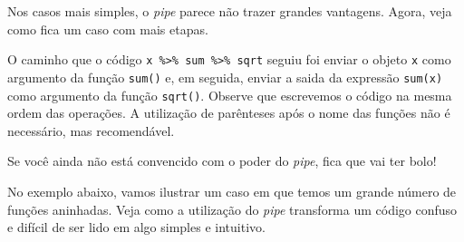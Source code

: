 \documentclass[]{book}
\newenvironment{Shaded}{\begin{snugshade}}{\end{snugshade}}
\newcommand{\CommentTok}[1]{\textcolor[rgb]{0.56,0.35,0.01}{\textit{#1}}}
\newcommand{\DecValTok}[1]{\textcolor[rgb]{0.00,0.00,0.81}{#1}}
\newcommand{\KeywordTok}[1]{\textcolor[rgb]{0.13,0.29,0.53}{\textbf{#1}}}
\newcommand{\NormalTok}[1]{#1}
\newcommand{\OperatorTok}[1]{\textcolor[rgb]{0.81,0.36,0.00}{\textbf{#1}}}
\newcommand{\StringTok}[1]{\textcolor[rgb]{0.31,0.60,0.02}{#1}}
\begin{document}
\begin{Shaded}
\end{Shaded}

Nos casos mais simples, o \emph{pipe} parece não trazer grandes vantagens. Agora, veja como fica um caso com mais etapas.

\begin{Shaded}
\end{Shaded}

O caminho que o código \texttt{x\ \%\textgreater{}\%\ sum\ \%\textgreater{}\%\ sqrt} seguiu foi enviar o objeto \texttt{x} como argumento da função \texttt{sum()} e, em seguida, enviar a saida da expressão \texttt{sum(x)} como argumento da função \texttt{sqrt()}. Observe que escrevemos o código na mesma ordem das operações. A utilização de parênteses após o nome das funções não é necessário, mas recomendável.

Se você ainda não está convencido com o poder do \emph{pipe}, fica que vai ter bolo!

No exemplo abaixo, vamos ilustrar um caso em que temos um grande número de funções aninhadas. Veja como a utilização do \emph{pipe} transforma um código confuso e difícil de ser lido em algo simples e intuitivo.
\end{document}
